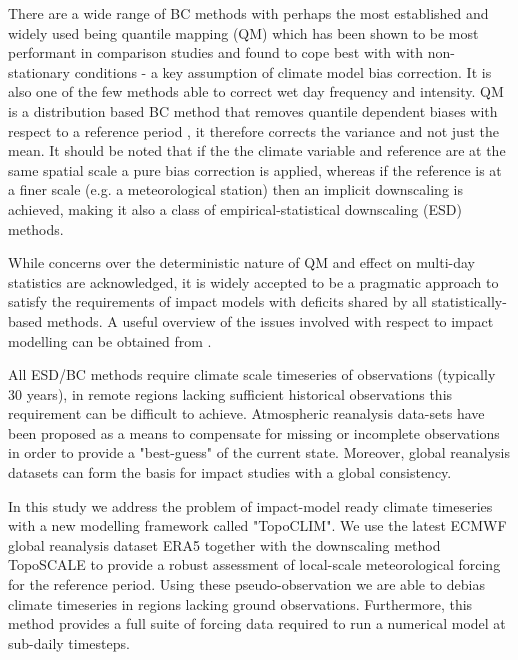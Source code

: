 \documentclass[hess, manuscript]{copernicus}
\begin{document}
There are a wide range of BC methods \citep{Gutmann2014-dq} with perhaps the most established and widely used being quantile mapping (QM) which has been shown to be most performant in comparison studies \citep{Teutschbein2013-nn, Jakob_Themes_l2011-xt} and found to cope best with with non-stationary conditions - a key assumption of climate model bias correction. It is also one of the few methods able to correct wet day frequency and intensity.  QM is a distribution based BC method that removes quantile dependent biases with respect to a reference period \citep{Ivanov2017-lt}, it therefore corrects the variance and not just the mean. It should be noted that if the the climate variable and reference are at the same spatial scale a pure bias correction is applied, whereas if the reference is at a finer scale (e.g. a meteorological station) then an implicit downscaling is achieved, making it also a class of empirical-statistical downscaling (ESD) methods.

While concerns over the deterministic nature of QM \citep{Maraun2013-gq} and effect on multi-day statistics \citep{Addor2014-ew}  are acknowledged, it is widely accepted to be a pragmatic approach to satisfy the requirements of impact models \citep{Rajczak2016-jk} with deficits shared by all statistically-based methods. A useful overview of the issues involved with respect to impact modelling can be obtained from \citet{Stocker_TF}.


All ESD/BC methods require climate scale timeseries of observations (typically 30 years), in remote regions lacking sufficient historical observations this requirement can be difficult to achieve. Atmospheric reanalysis data-sets have been proposed as a means to compensate for missing or incomplete observations \citep{Cao2019-wx, Fiddes2014-wt} in order to provide a "best-guess" of the current state. Moreover, global reanalysis datasets can form the basis for impact studies with a global consistency. %

In this study we address the problem of impact-model ready climate timeseries with a new modelling framework called "TopoCLIM". We use the latest ECMWF global reanalysis dataset ERA5 together with the downscaling method TopoSCALE \citep{Fiddes2014-wt} to provide a robust assessment of local-scale meteorological forcing for the reference period. Using these pseudo-observation we are able to debias climate timeseries in regions lacking ground observations. Furthermore, this method provides a full suite of forcing data required to run a numerical model at sub-daily timesteps. 
\end{document}
